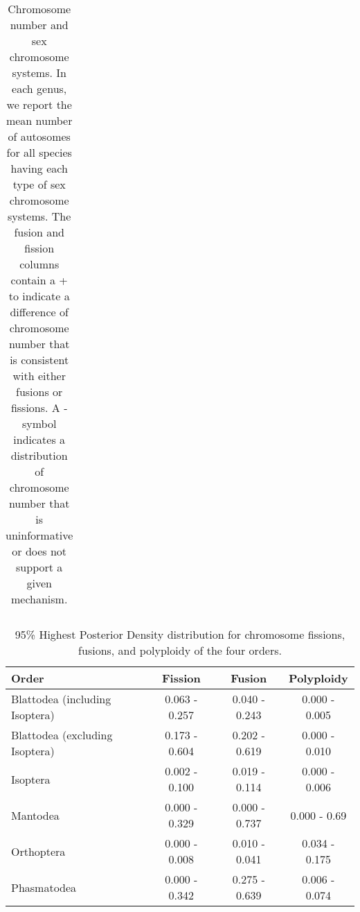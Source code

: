 \begin{table}
\begin{tabular}{llccccc}
\end{tabular}
\caption{Chromosome number and sex chromosome systems. In each genus, we report the mean number of autosomes for all species having each type of sex chromosome systems. The fusion and fission columns contain a + to indicate a difference of chromosome number that is consistent with either fusions or fissions. A - symbol indicates a distribution of chromosome number that is uninformative or does not support a given mechanism.}
\label{tab:fusions}
\end{table}

\begin{table}[ht]
\centering
\begin{tabular}{lccc}
\hline
\textbf{Order}          & \textbf{Fission} & \textbf{Fusion} & \textbf{Polyploidy} \\ \hline
Blattodea (including Isoptera)               & 0.063 - 0.257    & 0.040 - 0.243    & 0.000 - 0.005           \\
Blattodea (excluding Isoptera) & 0.173 - 0.604    & 0.202 - 0.619   & 0.000 - 0.010            \\
Isoptera                & 0.002 - 0.100      & 0.019 - 0.114   & 0.000 - 0.006           \\
Mantodea                & 0.000 - 0.329        & 0.000 - 0.737       & 0.000 - 0.69            \\
Orthoptera              & 0.000 - 0.008        & 0.010 - 0.041    & 0.034 - 0.175       \\
Phasmatodea             & 0.000 - 0.342        & 0.275 - 0.639   & 0.006 - 0.074       \\ \hline
\end{tabular}
\caption{95\% Highest Posterior Density distribution for chromosome fissions, fusions, and polyploidy of the four orders.}
\label{tab:HPD}
\end{table}